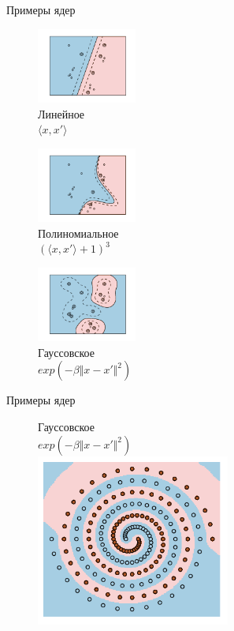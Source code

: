 \documentclass[12pt]{beamer}
\begin{document}
{
\begin{frame}{Примеры ядер}
	\begin{figure}[htbp]
		\begin{minipage}{.3\textwidth}
		  \includegraphics[height=70pt, keepaspectratio = true]{images/linear} \\
		  \centering Линейное\\$\langle x, x'\rangle$
	    \end{minipage}%
	    \begin{minipage}{.3\textwidth}
			\includegraphics[height=70pt, keepaspectratio = true]{images/poly}   \\
			\centering Полиномиальное\\$(\langle x, x'\rangle + 1)^3$
		\end{minipage}%
	    \begin{minipage}{.3\textwidth}
			\includegraphics[height=70pt, keepaspectratio = true]{images/gauss}   \\
			\centering Гауссовское\\$exp(-\beta \Vert x - x'\Vert^2 )$
		\end{minipage}%
	
	\end{figure}
\end{frame}
}

\begin{frame}{Примеры ядер}
	\begin{figure}[htbp]
	  \centering Гауссовское\\$exp(-\beta \Vert x - x'\Vert^2 )$\\
	  \includegraphics[height=160pt, keepaspectratio = true]{images/svm_spiral}
	\end{figure}
\end{frame}
\end{document}
